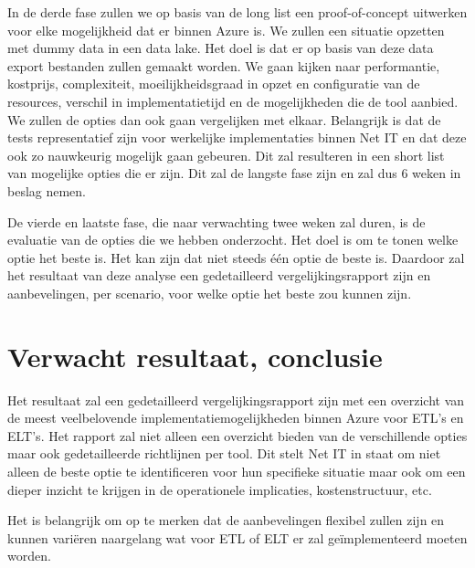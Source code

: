 In de derde fase zullen we op basis van de long list een proof-of-concept uitwerken voor elke mogelijkheid dat er binnen Azure is. We zullen een situatie opzetten met dummy data in een data lake. Het doel is dat er op basis van deze data export bestanden zullen gemaakt worden. We gaan kijken naar performantie, kostprijs, complexiteit, moeilijkheidsgraad in opzet en configuratie van de resources, verschil in implementatietijd en de mogelijkheden die de tool aanbied. We zullen de opties dan ook gaan vergelijken met elkaar. Belangrijk is dat de tests representatief zijn voor werkelijke implementaties binnen Net IT en dat deze ook zo nauwkeurig mogelijk gaan gebeuren. Dit zal resulteren in een short list van mogelijke opties die er zijn. Dit zal de langste fase zijn en zal dus 6 weken in beslag nemen.

De vierde en laatste fase, die naar verwachting twee weken zal duren, is de evaluatie van de opties die we hebben onderzocht. Het doel is om te tonen welke optie het beste is. Het kan zijn dat niet steeds één optie de beste is. Daardoor zal het resultaat van deze analyse een gedetailleerd vergelijkingsrapport zijn en aanbevelingen, per scenario, voor welke optie het beste zou kunnen zijn.


\section{Verwacht resultaat, conclusie}%
\label{sec:verwachte_resultaten}

Het resultaat zal een gedetailleerd vergelijkingsrapport zijn met een overzicht van de meest veelbelovende implementatiemogelijkheden binnen Azure voor ETL's en ELT's. Het rapport zal niet alleen een overzicht bieden van de verschillende opties maar ook gedetailleerde richtlijnen per tool. Dit stelt Net IT in staat om niet alleen de beste optie te identificeren voor hun specifieke situatie maar ook om een dieper inzicht te krijgen in de operationele implicaties, kostenstructuur, etc. 

Het is belangrijk om op te merken dat de aanbevelingen flexibel zullen zijn en kunnen variëren naargelang wat voor ETL of ELT er zal geïmplementeerd moeten worden.


